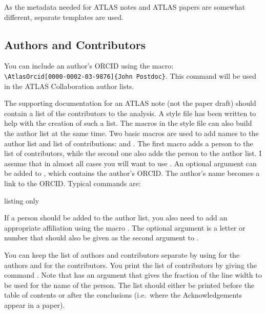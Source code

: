  As the metadata needed for ATLAS notes and ATLAS papers are somewhat different,
separate templates are used.


\subsection{Authors and Contributors}
\label{sec:contribute}

You can include an author's ORCID using the  macro:\\
\verb+\AtlasOrcid[0000-0002-03-9876]{John Postdoc}+.
This command will be used in the ATLAS Collaboration author lists.

The supporting documentation for an ATLAS note (not the paper draft) should contain a list of the contributors to the analysis.
A style file  has been written to help with the creation of such a list.
The macros in the style file can also build the author list at the same time.
Two basic macros are used to add names to the author list and list of contributions:
 and . 
The first macro adds a person to the list of contributors, while the second one also adds the person
to the author list. I assume that in almost all cases you will want to use .
An optional argument can be added to , which contains the author's ORCID.
The author's name becomes a link to the ORCID.
Typical commands are:
\begin{tcblisting}{listing only}
\end{tcblisting}
If a person should be added to the author list, you also need to add an appropriate affiliation using the macro .
The optional argument is a letter or number that should also be given as the second argument to
.

You can keep the list of authors and contributors separate
by using  for the authors and  for the contributors.
You print the list of contributors by giving the command .
Note that  has an argument that gives the fraction of the line width
to be used for the name of the person.
The list should either be printed before the table of contents or after the conclusions
(i.e.\ where the Acknowledgements appear in a paper).

